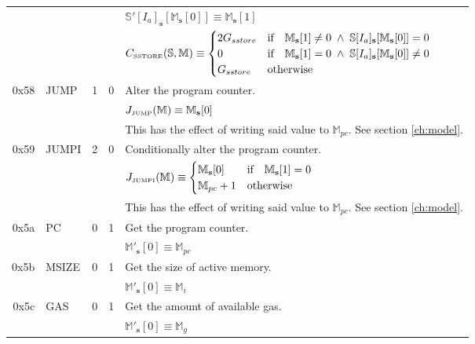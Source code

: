 \documentclass[9pt,oneside]{amsart}
\begin{document}
\begin{tabular*}{\columnwidth}[h]{rlrrl}
&&&& $\mathbb{S}'[I_a]_\mathbf{s}[ \mathbb{M}_\mathbf{s}[0] ] \equiv \mathbb{M}_\mathbf{s}[1] $ \\
&&&& $C_{\text{\tiny SSTORE}}(\mathbb{S}, \mathbb{M}) \equiv \begin{cases}
2G_{sstore} & \text{if} \quad \mathbb{M}_\mathbf{s}[1] \neq 0 \; \wedge \; \mathbb{S}[I_a]_\mathbf{s}[\mathbb{M}_\mathbf{s}[0]] = 0 \\
0 & \text{if} \quad \mathbb{M}_\mathbf{s}[1] = 0 \; \wedge \; \mathbb{S}[I_a]_\mathbf{s}[\mathbb{M}_\mathbf{s}[0]] \neq 0 \\
G_{sstore} & \text{otherwise}
\end{cases}$ \\
\midrule
0x58 & {\small JUMP} & 1 & 0 & Alter the program counter. \\
&&&& $J_{\text{\tiny JUMP}}(\mathbb{M}) \equiv \mathbb{M}_\mathbf{s}[0] $ \\
&&&& This has the effect of writing said value to $\mathbb{M}_{pc}$. See section \ref{ch:model}. \\
\midrule
0x59 & {\small JUMPI} & 2 & 0 & Conditionally alter the program counter. \\
&&&& $J_{\text{\tiny JUMPI}}(\mathbb{M}) \equiv \begin{cases} \mathbb{M}_\mathbf{s}[0] & \text{if} \quad \mathbb{M}_\mathbf{s}[1] = 0 \\ \mathbb{M}_{pc} + 1 & \text{otherwise} \end{cases} $ \\
&&&& This has the effect of writing said value to $\mathbb{M}_{pc}$. See section \ref{ch:model}. \\
\midrule
0x5a & {\small PC} & 0 & 1 & Get the program counter. \\
&&&& $\mathbb{M}'_\mathbf{s}[0] \equiv \mathbb{M}_{pc}$ \\
\midrule
0x5b & {\small MSIZE} & 0 & 1 & Get the size of active memory. \\
&&&& $\mathbb{M}'_\mathbf{s}[0] \equiv \mathbb{M}_{i}$ \\
\midrule
0x5c & {\small GAS} & 0 & 1 & Get the amount of available gas. \\
&&&& $\mathbb{M}'_\mathbf{s}[0] \equiv \mathbb{M}_{g}$ \\
\bottomrule
\end{tabular*}
\end{document}
